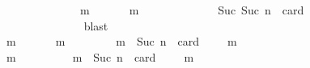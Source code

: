\begin{isabellebody}
\ {\isacartoucheopen}{\isasymforall}\ {\isasymsigma}\ {\isasymin}\ {\isasymSigma}{\isachardot}\ {\isasymforall}\ {\isasymsigma}{\isacharprime}\ {\isasymin}\ {\isasymSigma}{\isachardot}\ {\isasymnot}\ {\isasymsigma}\ {\isasymsubseteq}\ {\isasymsigma}{\isacharprime}\ {\isasymlongrightarrow}\ {\isacharparenleft}{\isasymexists}\ m\ {\isasymin}\ {\isasymsigma}\ {\isacharminus}\ {\isasymsigma}{\isacharprime}{\isachardot}\ {\isasymsigma}{\isacharprime}\ {\isasymunion}\ {\isacharbraceleft}m{\isacharbraceright}\ {\isasymin}\ {\isasymSigma}{\isacharparenright}{\isacartoucheclose}\ {\isacartoucheopen}{\isasymsigma}\ {\isasymin}\ {\isasymSigma}{\isacartoucheclose}\ {\isacartoucheopen}{\isasymsigma}{\isacharprime}\ {\isasymin}\ {\isasymSigma}{\isacartoucheclose}\ {\isacartoucheopen}{\isasymnot}\ {\isasymsigma}\ {\isasymsubseteq}\ {\isasymsigma}{\isacharprime}\ {\isasymand}\ Suc\ {\isacharparenleft}Suc\ n{\isacharparenright}\ {\isacharequal}\ card\ {\isacharparenleft}{\isasymsigma}\ {\isacharminus}\ {\isasymsigma}{\isacharprime}{\isacharparenright}{\isacartoucheclose}\isanewline
\ \ \ \ \ \ \ \ \ \ \ \ \ \ \isamarkupfalse%
\ blast\isanewline
\ \ \ \ \ \ \ \ \ \ \ \ \isamarkupfalse%
\ \isamarkupfalse%
\ {\isachardoublequoteopen}{\isasymexists}\ m\ {\isasymin}\ {\isasymsigma}\ {\isacharminus}\ {\isasymsigma}{\isacharprime}{\isachardot}\ {\isasymsigma}{\isacharprime}\ {\isasymunion}\ {\isacharbraceleft}m{\isacharbraceright}\ {\isasymin}\ {\isasymSigma}\ {\isasymand}\ {\isasymnot}\ {\isasymsigma}\ {\isasymsubseteq}\ {\isasymsigma}{\isacharprime}\ {\isasymunion}\ {\isacharbraceleft}m{\isacharbraceright}\ {\isasymand}\ Suc\ n\ {\isacharequal}\ card\ {\isacharparenleft}{\isasymsigma}\ {\isacharminus}\ {\isacharparenleft}{\isasymsigma}{\isacharprime}\ {\isasymunion}\ {\isacharbraceleft}m{\isacharbraceright}{\isacharparenright}{\isacharparenright}{\isachardoublequoteclose}\isanewline
\ \ \ \ \ \ \ \ \ \ \ \ \ \ \isamarkupfalse%
\ {\isacartoucheopen}{\isasymforall}\ m\ {\isasymin}\ {\isasymsigma}\ {\isacharminus}\ {\isasymsigma}{\isacharprime}{\isachardot}\ {\isasymnot}\ {\isasymsigma}\ {\isasymsubseteq}\ {\isasymsigma}{\isacharprime}\ {\isasymunion}\ {\isacharbraceleft}m{\isacharbraceright}\ {\isasymand}\ Suc\ n\ {\isacharequal}\ card\ {\isacharparenleft}{\isasymsigma}\ {\isacharminus}\ {\isacharparenleft}{\isasymsigma}{\isacharprime}\ {\isasymunion}\ {\isacharbraceleft}m{\isacharbraceright}{\isacharparenright}{\isacharparenright}{\isacartoucheclose}\ \isanewline
\ \ \ \ \ \ \ \ \ \ \ \ \ \ \isamarkupfalse%

\end{isabellebody}
